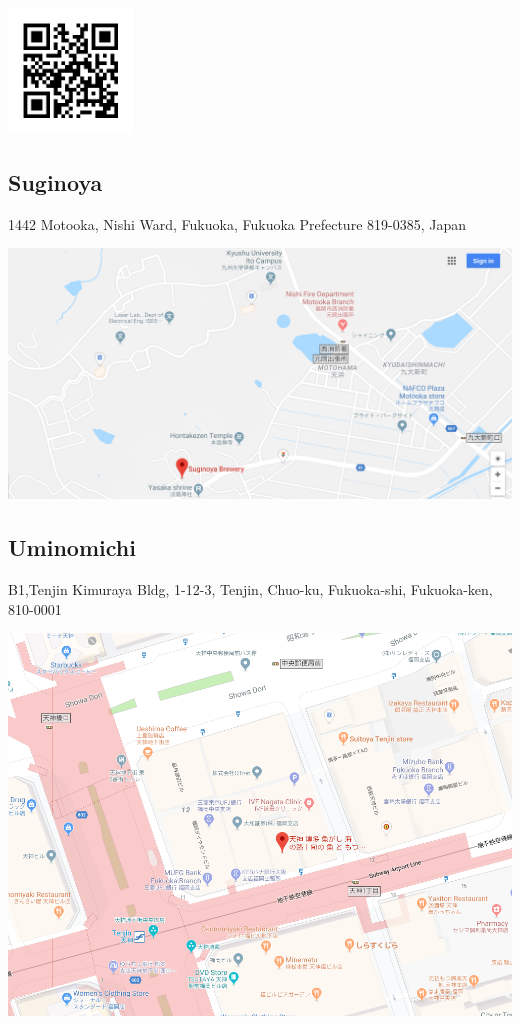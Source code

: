 \includegraphics[width=0.25\textwidth]{google_map01_qr.png}

\newpage
\subsection*{Suginoya}
1442 Motooka, Nishi Ward, Fukuoka, Fukuoka Prefecture 819-0385, Japan

\noindent\includegraphics[width=\textwidth]{suginoya.png}

\newpage
\subsection*{Uminomichi}
B1,Tenjin Kimuraya Bldg, 1-12-3, Tenjin, Chuo-ku, Fukuoka-shi, Fukuoka-ken, 810-0001

\noindent\includegraphics[width=\textwidth]{uminomichi.png}

